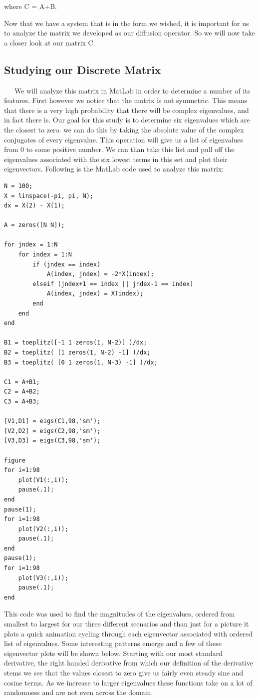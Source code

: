 \documentclass[12pt]{article}
\begin{document}
where C = A+B.

Now that we have a system that is in the form we wished, it is important for us to analyze the matrix we developed as our diffusion operator. So we will now take a closer look at our matrix C.

\subsection*{Studying our Discrete Matrix}

\ \ \ We will analyze this matrix in MatLab in order to determine a number of its features. First however we notice that the matrix is not symmetric. This means that there is a very high probability that there will be complex eigenvalues, and in fact there is. Our goal for this study is to determine six eigenvalues which are the closest to zero. we can do this by taking the absolute value of the complex conjugates of every eigenvalue. This operation will give us a list of eigenvalues from 0 to some positive number. We can than take this list and pull off the eigenvalues associated with the six lowest terms in this set and plot their eigenvectors. Following is the MatLab code used to analyze this matrix:

\begin{verbatim}
N = 100;
X = linspace(-pi, pi, N);
dx = X(2) - X(1);

A = zeros([N N]);

for jndex = 1:N
    for index = 1:N
        if (jndex == index)
            A(index, jndex) = -2*X(index);
        elseif (jndex+1 == index || jndex-1 == index)
            A(index, jndex) = X(index);
        end
    end
end

B1 = toeplitz([-1 1 zeros(1, N-2)] )/dx;
B2 = toeplitz( [1 zeros(1, N-2) -1] )/dx;
B3 = toeplitz( [0 1 zeros(1, N-3) -1] )/dx;

C1 = A+B1;
C2 = A+B2;
C3 = A+B3;

[V1,D1] = eigs(C1,98,'sm');
[V2,D2] = eigs(C2,98,'sm');
[V3,D3] = eigs(C3,98,'sm');

figure
for i=1:98
    plot(V1(:,i));
    pause(.1);
end
pause(1);
for i=1:98
    plot(V2(:,i));
    pause(.1);
end
pause(1);
for i=1:98
    plot(V3(:,i));
    pause(.1);
end
\end{verbatim}

This code was used to find the magnitudes of the eigenvalues, ordered from smallest to largest for our three different scenarios and than just for a picture it plots a quick animation cycling through each eigenvector associated with ordered list of eigenvalues. Some interesting patterns emerge and a few of these eigenvector plots will be shown below. Starting with our most standard derivative, the right handed derivative from which our definition of the derivative stems we see that the values closest to zero give us fairly even steady sine and cosine terms. As we increase to larger eigenvalues these functions take on a lot of randomness and are not even across the domain.\\ 
\end{document}
